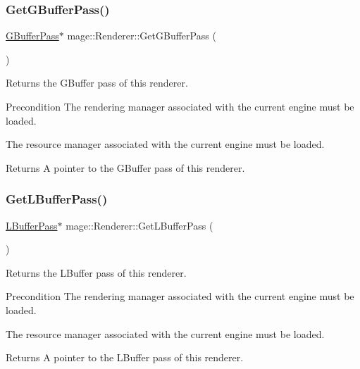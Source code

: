 \subsubsection{\texorpdfstring{Get\+G\+Buffer\+Pass()}{GetGBufferPass()}}
{\footnotesize\ttfamily \hyperlink{classmage_1_1_g_buffer_pass}{G\+Buffer\+Pass}$\ast$ mage\+::\+Renderer\+::\+Get\+G\+Buffer\+Pass (\begin{DoxyParamCaption}{ }\end{DoxyParamCaption})}

Returns the G\+Buffer pass of this renderer.

\begin{DoxyPrecond}{Precondition}
The rendering manager associated with the current engine must be loaded. 

The resource manager associated with the current engine must be loaded. 
\end{DoxyPrecond}
\begin{DoxyReturn}{Returns}
A pointer to the G\+Buffer pass of this renderer. 
\end{DoxyReturn}
\hypertarget{classmage_1_1_renderer_a6b43c7342a017282e5f9f14ac581ea2b}{}\label{classmage_1_1_renderer_a6b43c7342a017282e5f9f14ac581ea2b} 
\subsubsection{\texorpdfstring{Get\+L\+Buffer\+Pass()}{GetLBufferPass()}}
{\footnotesize\ttfamily \hyperlink{structmage_1_1_l_buffer_pass}{L\+Buffer\+Pass}$\ast$ mage\+::\+Renderer\+::\+Get\+L\+Buffer\+Pass (\begin{DoxyParamCaption}{ }\end{DoxyParamCaption})}

Returns the L\+Buffer pass of this renderer.

\begin{DoxyPrecond}{Precondition}
The rendering manager associated with the current engine must be loaded. 

The resource manager associated with the current engine must be loaded. 
\end{DoxyPrecond}
\begin{DoxyReturn}{Returns}
A pointer to the L\+Buffer pass of this renderer. 
\end{DoxyReturn}
\hypertarget{classmage_1_1_renderer_a57e18039593423628715375e7a1b1163}{}\label{classmage_1_1_renderer_a57e18039593423628715375e7a1b1163} 
